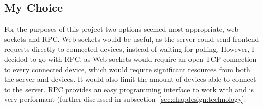 \subsection{My Choice}
For the purposes of this project two options seemed most appropriate, web sockets and RPC. Web sockets would be useful, as the server could send frontend requests directly to connected devices, instead of waiting for polling. However, I decided to go with RPC, as Web sockets would require an open TCP connection to every connected device, which would require significant resources from both the server and devices. It would also limit the amount of devices able to connect to the server. RPC provides an easy programming interface to work with and is very performant (further discussed in subsection~\ref{sec:chapdesign:technology}.
